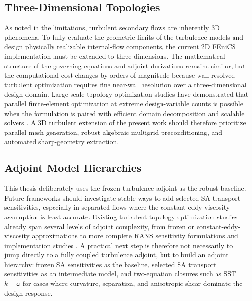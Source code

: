 \subsection{Three-Dimensional Topologies}
As noted in the limitations, turbulent secondary flows are inherently 3D phenomena. To fully evaluate the geometric limits of the turbulence models and design physically realizable internal-flow components, the current 2D FEniCS implementation must be extended to three dimensions. The mathematical structure of the governing equations and adjoint derivations remains similar, but the computational cost changes by orders of magnitude because wall-resolved turbulent optimization requires fine near-wall resolution over a three-dimensional design domain. Large-scale topology optimization studies have demonstrated that parallel finite-element optimization at extreme design-variable counts is possible when the formulation is paired with efficient domain decomposition and scalable solvers \cite{Aage2017}. A 3D turbulent extension of the present work should therefore prioritize parallel mesh generation, robust algebraic multigrid preconditioning, and automated sharp-geometry extraction.

\subsection{Adjoint Model Hierarchies}
This thesis deliberately uses the frozen-turbulence adjoint as the robust baseline. Future frameworks should investigate stable ways to add selected SA transport sensitivities, especially in separated flows where the constant-eddy-viscosity assumption is least accurate. Existing turbulent topology optimization studies already span several levels of adjoint complexity, from frozen or constant-eddy-viscosity approximations \cite{Dilgen2018,Zymaris2009} to more complete RANS sensitivity formulations and implementation studies \cite{Margetis2024,Wu2023}. A practical next step is therefore not necessarily to jump directly to a fully coupled turbulence adjoint, but to build an adjoint hierarchy: frozen SA sensitivities as the baseline, selected SA transport sensitivities as an intermediate model, and two-equation closures such as SST $k-\omega$ for cases where curvature, separation, and anisotropic shear dominate the design response.

